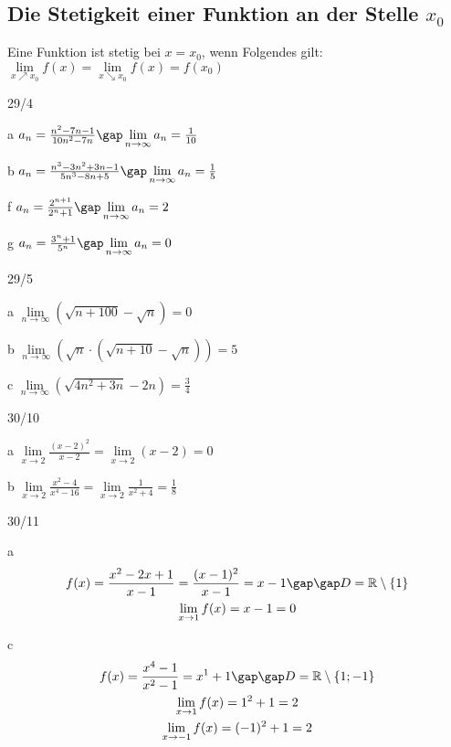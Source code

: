 \subsection{Die Stetigkeit einer Funktion an der Stelle $x_0$}
Eine Funktion ist stetig bei $x = x_0$, wenn Folgendes gilt: \\
$\lim\limits_{x \nearrow x_0} f(x) = \lim\limits_{x \searrow x_0} f(x) = f(x_0)$
\begin{exercise}{29/4}
  \item [a]
  $a_n = \frac{n^2 - 7n - 1}{10n^2 - 7n}\gap \lim\limits_{n \to \infty} a_n = \frac{1}{10}$
  \item [b]
  $a_n = \frac{n^3 - 3n^2 + 3n - 1}{5n^3 - 8n + 5}\gap \lim\limits_{n \to \infty} a_n = \frac{1}{5}$
  \item [f]
  $a_n = \frac{2^{n + 1}}{2^n + 1}\gap \lim\limits_{n \to \infty} a_n = 2$
  \item [g]
  $a_n = \frac{3^n + 1}{5^n}\gap \lim\limits_{n \to \infty} a_n = 0$
\end{exercise}
\begin{exercise}{29/5}
  \item [a]
  $\lim\limits_{n \to \infty} (\sqrt{n + 100} - \sqrt{n}) = 0$
  \item [b]
  $\lim\limits_{n \to \infty} (\sqrt{n} \cdot (\sqrt{n + 10} - \sqrt{n})) = 5$
  \item [c]
  $\lim\limits_{n \to \infty} (\sqrt{4n^2 + 3n} - 2n) = \frac{3}{4}$
\end{exercise}
\begin{exercise}{30/10}
  \item [a]
  $\lim\limits_{x \to 2} \frac{(x - 2)^2}{x - 2} = \lim\limits_{x \to 2} (x - 2) = 0$
  \item [b]
  $\lim\limits_{x \to 2} \frac{x^2 - 4}{x^4 - 16} = \lim\limits_{x \to 2} \frac{1}{x^2 + 4} = \frac{1}{8}$
\end{exercise}
\begin{onepage}
  \begin{exercise}{30/11}
    \item [a]
    \begin{gather*}
      f(x) = \frac{x^2 - 2x + 1}{x - 1} = \frac{(x - 1)^2}{x - 1} = x - 1 \gap\gap D = \mathbb{R} \setminus \{1\} \\
      \lim\limits_{x \to 1} f(x) = x - 1 = 0
    \end{gather*}
    \item [c]
    \begin{gather*}
      f(x) = \frac{x^4 - 1}{x^2 - 1} = x^1 + 1 \gap\gap D = \mathbb{R} \setminus \{1; -1\} \\
      \lim\limits_{x \to 1} f(x) = 1^2 + 1 = 2 \\
      \lim\limits_{x \to -1} f(x) = (-1)^2 + 1 = 2
    \end{gather*}
  \end{exercise}
\end{onepage}
